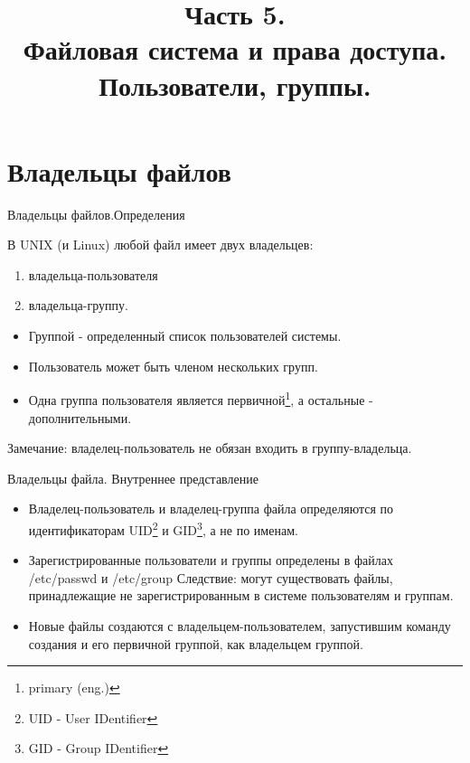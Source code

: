 

\title[SaM Solutions. Linux QA Training]
{
  Часть 5.\\
  Файловая система и права доступа.\\
  Пользователи, группы.
}

\lstset{basicstyle=\tiny}



\firstframe

\section{Владельцы файлов}

\begin{frame}[fragile]{Владельцы файлов.Определения}

  В UNIX (и Linux) любой файл имеет двух владельцев:
  \begin{enumerate}
    \item владельца-пользователя
    \item владельца-группу.
  \end{enumerate} 
   
  \pause

  \begin{itemize}
    \item \alert{Группой} - определенный список пользователей системы.
    \item Пользователь может быть членом нескольких групп. 
    \item Одна группа пользователя является первичной\footnote{primary (eng.)}, а остальные - дополнительными.
  \end{itemize}
  \small{Замечание: владелец-пользователь не обязан входить в группу-владельца.}
  

\end{frame}

\begin{frame}[fragile]{Владельцы файла. Внутреннее представление}
  \begin{itemize}
    \item \alert{Владелец-пользователь} и \alert{владелец-группа} файла определяются по идентификаторам \alert{UID}\footnote{UID - User IDentifier} и \alert{GID}\footnote{GID - Group IDentifier}, а не по именам. 
 \pause
    \item Зарегистрированные пользователи и группы определены в файлах \alert{/etc/passwd} и \alert{/etc/group} \newline
    Следствие: могут существовать файлы, принадлежащие не зарегистрированным в системе пользователям и группам. \pause
    \item Новые файлы создаются с владельцем-пользователем, запустившим команду создания и его первичной группой, как владельцем группой. \pause
  \end{itemize}

\end{frame}

